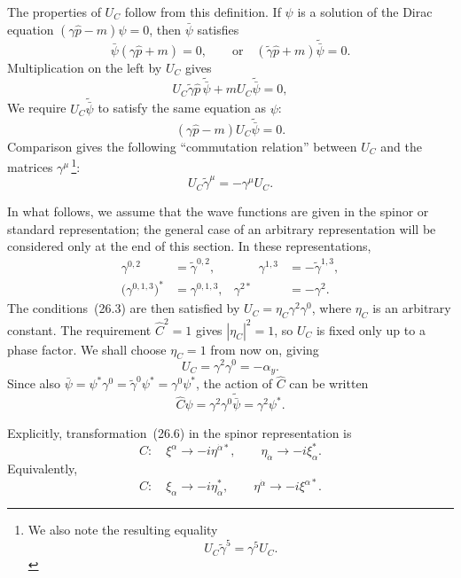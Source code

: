 The properties of $U_C$ follow from this definition. If $\psi$ is a solution of the Dirac equation $(\gamma\widehat p - m)\psi = 0$, then $\bar\psi$ satisfies
\[
\bar\psi(\gamma\widehat p + m) = 0,\qquad \text{or}\quad (\widetilde\gamma\widehat p + m)\widetilde{\bar\psi} = 0.
\]
Multiplication on the left by $U_C$ gives
\[
U_C\widetilde\gamma\widehat p\,\widetilde{\bar\psi} + mU_C\widetilde{\bar\psi} = 0,
\]
We require $U_C\widetilde{\bar\psi}$ to satisfy the same equation as $\psi$:
\[
(\gamma\widehat p - m)U_C\widetilde{\bar\psi} = 0.
\]
Comparison gives the following ``commutation relation'' between $U_C$ and the matrices $\gamma^\mu$\,\footnote{We also note the resulting equality
\begin{equation}
U_C\widetilde\gamma^5 = \gamma^5U_C.
\tag{26.3a}
\end{equation}}:
\begin{equation}
U_C\widetilde\gamma^\mu = -\gamma^\mu U_C.
\tag{26.3}
\end{equation}

In what follows, we assume that the wave functions are given in the spinor or standard representation; the general case of an arbitrary representation will be considered only at the end of this section. In these representations,
\begin{equation}
\begin{aligned}
\gamma^{0,2} &= \widetilde\gamma^{0,2},&\qquad
\gamma^{1,3} &= -\widetilde\gamma^{1,3},\\
\bigl(\gamma^{0,1,3}\bigr)^* &= \gamma^{0,1,3},&
\gamma^{2*} &= -\gamma^2.
\end{aligned}
\tag{26.4}
\end{equation}
The conditions~(26.3) are then satisfied by $U_C = \eta_C\gamma^2\gamma^0$, where $\eta_C$ is an arbitrary constant. The requirement $\widehat C^2 = 1$ gives $|\eta_C|^2 = 1$, so $U_C$ is fixed only up to a phase factor. We shall choose $\eta_C = 1$ from now on, giving
\begin{equation}
U_C = \gamma^2\gamma^0 = -\alpha_y.
\tag{26.5}
\end{equation}
Since also $\bar\psi = \psi^*\gamma^0 = \widetilde\gamma^0\psi^* = \gamma^0\psi^*$, the action of $\widehat C$ can be written
\begin{equation}
\widehat C\psi = \gamma^2\gamma^0\widetilde{\bar\psi} = \gamma^2\psi^*.
\tag{26.6}
\end{equation}

Explicitly, transformation~(26.6) in the spinor representation is
\begin{equation}
C:\quad \xi^\alpha \to -i\eta^{\dot\alpha*},\qquad
\eta_{\dot\alpha} \to -i\xi^*_\alpha.
\tag{26.7a}
\end{equation}
Equivalently,
\begin{equation}
C:\quad \xi_\alpha \to -i\eta^*_{\dot\alpha},\qquad
\eta^{\dot\alpha} \to -i\xi^{\alpha*}.
\tag{26.7b}
\end{equation}

